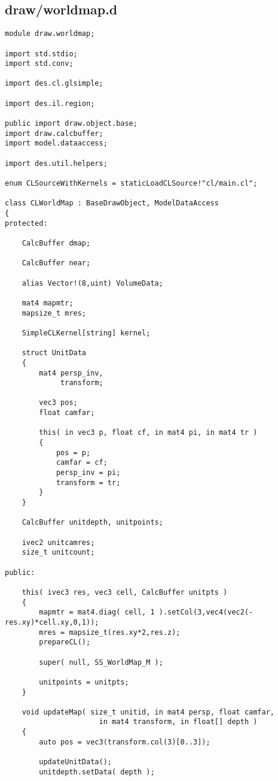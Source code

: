 \subsection{draw/worldmap.d}

\begin{verbatim}
module draw.worldmap;

import std.stdio;
import std.conv;

import des.cl.glsimple;

import des.il.region;

public import draw.object.base;
import draw.calcbuffer;
import model.dataaccess;

import des.util.helpers;

enum CLSourceWithKernels = staticLoadCLSource!"cl/main.cl";

class CLWorldMap : BaseDrawObject, ModelDataAccess
{
protected:

    CalcBuffer dmap;

    CalcBuffer near;

    alias Vector!(8,uint) VolumeData;

    mat4 mapmtr;
    mapsize_t mres;

    SimpleCLKernel[string] kernel;

    struct UnitData
    {
        mat4 persp_inv,
             transform;

        vec3 pos;
        float camfar;

        this( in vec3 p, float cf, in mat4 pi, in mat4 tr )
        {
            pos = p;
            camfar = cf;
            persp_inv = pi;
            transform = tr;
        }
    }

    CalcBuffer unitdepth, unitpoints;

    ivec2 unitcamres;
    size_t unitcount;

public:

    this( ivec3 res, vec3 cell, CalcBuffer unitpts )
    {
        mapmtr = mat4.diag( cell, 1 ).setCol(3,vec4(vec2(-res.xy)*cell.xy,0,1));
        mres = mapsize_t(res.xy*2,res.z);
        prepareCL();

        super( null, SS_WorldMap_M );

        unitpoints = unitpts;
    }

    void updateMap( size_t unitid, in mat4 persp, float camfar,
                      in mat4 transform, in float[] depth )
    {
        auto pos = vec3(transform.col(3)[0..3]);

        updateUnitData();
        unitdepth.setData( depth );


\end{verbatim}
